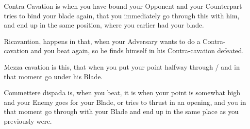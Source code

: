 \newpage


\newpage



Contra-Cavation is when you have bound your Opponent and your
Counterpart tries to bind your blade again, that you immediately go
through this with him, and end up in the same position, where you
earlier had your blade.


Ricavantion, happens in that, when your Adversary wants to do a
Contra-cavation and you beat again, so he finds himself in his
Contra-cavation defeated.


Mezza cavation is this, that when you put your point halfway through /
and in that moment go under his Blade.


Commettere dispada is, when you beat, it is when your point is
somewhat high and your Enemy goes for your Blade, or tries to thrust
in an opening, and you in that moment go through with your Blade and
end up in the same place as you previously were.



